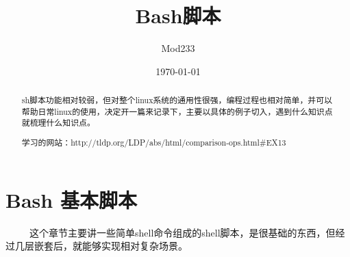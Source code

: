 \documentclass[12pt]{article}  %
\title{Bash脚本}
\author{Mod233}
\date{\today}
\begin{document}

\maketitle
\begin{abstract}
sh脚本功能相对较弱，但对整个linux系统的通用性很强，编程过程也相对简单，并可以帮助日常linux的使用，决定开一篇来记录下，主要以具体的例子切入，遇到什么知识点就梳理什么知识点。\par
学习的网站：http://tldp.org/LDP/abs/html/comparison-ops.html\#EX13
\end{abstract}
\tableofcontents
\section{Bash 基本脚本} %
\ \ \ \ \ 这个章节主要讲一些简单shell命令组成的shell脚本，是很基础的东西，但经过几层嵌套后，就能够实现相对复杂场景。
\label{sec:熟悉latex}
\end{document}
